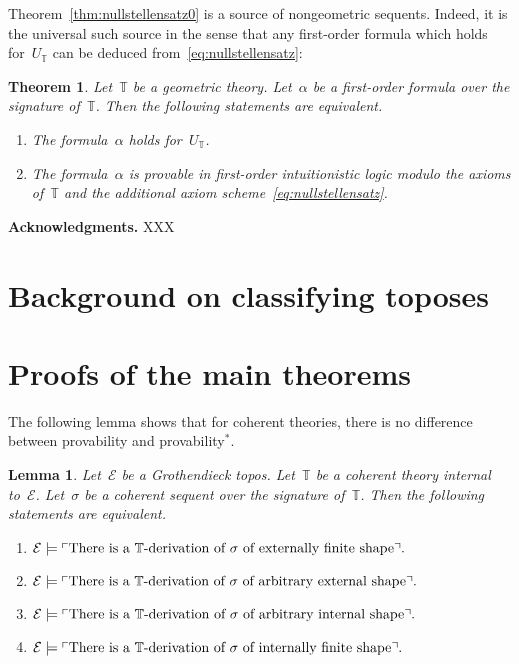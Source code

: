 \documentclass[oneside,reqno]{amsart}
\theoremstyle{definition}
\theoremstyle{plain}
\newtheorem{lemma}[defn]{Lemma}
\newtheorem{thm}[defn]{Theorem}
\theoremstyle{remark}
\newcommand{\E}{\mathcal{E}}
\newcommand{\TT}{\mathbb{T}}
\renewcommand{\_}{\mathpunct{.}\,}
\newcommand{\?}{\,{:}\,}
\newcommand{\speak}[1]{\ulcorner\text{\textnormal{#1}}\urcorner}
\renewcommand{\paragraph}[1]{\noindent\textbf{#1.}}
\begin{document}
Theorem~\ref{thm:nullstellensatz0} is a source of nongeometric sequents. Indeed,
it is the universal such source in the sense that any first-order formula
which holds for~$U_\TT$ can be deduced from~\eqref{eq:nullstellensatz}:

\begin{thm}\label{thm:characterization0}
Let~$\TT$ be a geometric theory. Let~$\alpha$ be a first-order
formula over the signature of~$\TT$. Then the following statements are
equivalent.
\begin{enumerate}
\item The formula~$\alpha$ holds for~$U_\TT$.
\item The formula~$\alpha$ is provable in first-order intuitionistic logic
modulo the axioms of~$\TT$ and the additional axiom
scheme~\eqref{eq:nullstellensatz}.
\end{enumerate}
\end{thm}


\paragraph{Acknowledgments} XXX


\section{Background on classifying toposes}

\section{Proofs of the main theorems}

The following lemma shows that for coherent theories, there is no difference
between provability and provability$^*$.

\begin{lemma}Let~$\E$ be a Grothendieck topos. Let~$\TT$ be a coherent theory
internal to~$\E$. Let~$\sigma$ be a coherent sequent over the signature
of~$\TT$. Then the following statements are equivalent.
\begin{enumerate}
\item $\E \models \speak{There is a~$\TT$-derivation of~$\sigma$ of externally
finite shape}.$
\item $\E \models \speak{There is a~$\TT$-derivation of~$\sigma$ of arbitrary
external shape}.$
\item $\E \models \speak{There is a~$\TT$-derivation of~$\sigma$ of arbitrary
internal shape}.$
\item $\E \models \speak{There is a~$\TT$-derivation of~$\sigma$ of internally
finite shape}.$
\end{enumerate}
\end{lemma}
\end{document}
